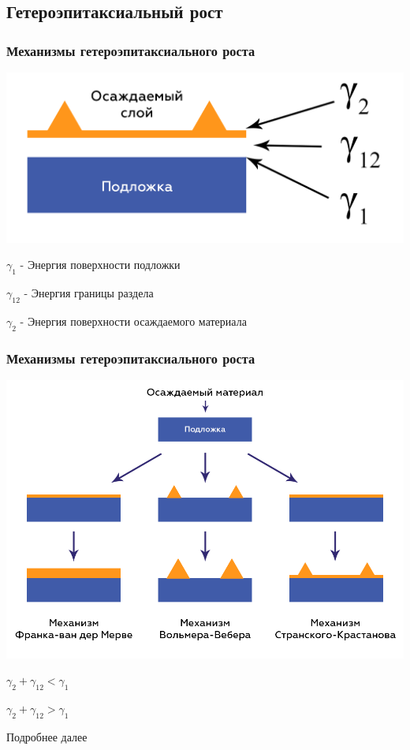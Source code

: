 \documentclass[10pt,pdf,hyperref={unicode}, dvipsnames]{beamer}
\begin{document}
\subsection{Гетероэпитаксиальный рост}
\begin{frame}[t]
	\frametitle{Механизмы гетероэпитаксиального роста}
	\includegraphics[width = \linewidth]{imgs/struct.png}
	\Large

	$\gamma_1$ - Энергия поверхности подложки
	
	
	$\gamma_{12}$ - Энергия границы раздела
	
	
	$\gamma_2$ - Энергия поверхности осаждаемого материала


\end{frame}

\normalsize
\begin{frame}[t]
	\frametitle{Механизмы гетероэпитаксиального роста}
	\includegraphics[width = \linewidth]{imgs/growth.png}

	\centering
	\begin{minipage}{0.32\linewidth}
		\centering
		$ \gamma_2+\gamma_{12}<\gamma_1 $	
	\end{minipage}
	\begin{minipage}{0.32\linewidth}
		\centering
		$ \gamma_2+\gamma_{12}>\gamma_1 $	
	\end{minipage}
	\begin{minipage}{0.32\linewidth}
		\centering
		Подробнее далее %
	\end{minipage}

\end{frame}
\end{document}
